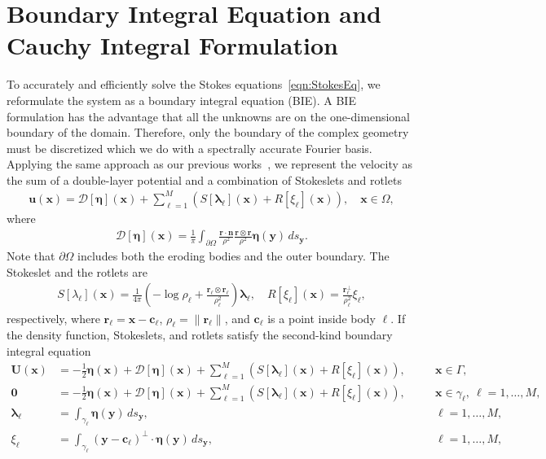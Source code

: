 \documentclass[3p]{elsarticle}
\newcommand{\bd}{{\partial}}
\newcommand{\cc}{{\mathbf{c}}}
\newcommand{\DDD}{{\boldsymbol{\mathcal D}}}
\newcommand{\eeta}{{\boldsymbol\eta}}
\newcommand{\llambda}{{\boldsymbol\lambda}}
\newcommand{\nn}{{\mathbf{n}}}
\newcommand{\rr}{{\mathbf{r}}}
\newcommand{\uu}{{\mathbf{u}}}
\newcommand{\UU}{{\mathbf{U}}}
\newcommand{\xx}{{\mathbf{x}}}
\newcommand{\yy}{{\mathbf{y}}}
\begin{document}
\section{Boundary Integral Equation and Cauchy Integral Formulation}
\label{sec:DLP}
To accurately and efficiently solve the Stokes
  equations~\eqref{eqn:StokesEq}, we reformulate the system as a
  boundary integral equation (BIE). A BIE formulation has the advantage
  that all the unknowns are on the one-dimensional boundary of the
  domain. Therefore, only the boundary of the complex geometry must be
  discretized which we do with a spectrally accurate Fourier basis.
  Applying the same approach as our previous
  works~\citep{quaife2018boundary, chiu2020viscous}, we represent the
  velocity as the sum of a double-layer potential and a combination of
  Stokeslets and rotlets~\cite{pow-mir1987}
\begin{align}
  \uu(\xx) = \DDD[\eeta](\xx) + \sum_{\ell=1}^{M}\left(
    S[\llambda_\ell](\xx) + R[\xi_\ell](\xx)\right), 
    \quad \xx \in \Omega,
  \label{eqn:velocity}
\end{align}
where 
\begin{align}
  \DDD[\eeta](\xx) = \frac{1}{\pi}\int_{\bd\Omega} 
  \frac{\rr \cdot \nn}{\rho^2} \frac{\rr \otimes \rr}{\rho^2}
  \eeta(\yy) \, ds_\yy.
  \label{eqn:velocityDLP}
\end{align}
Note that $\bd\Omega$ includes both the eroding bodies and the outer
boundary. The Stokeslet and the rotlets are
\begin{align}
  S[\lambda_\ell](\xx) = \frac{1}{4\pi} \left(-\log \rho_\ell +
  \frac{\rr_\ell \otimes \rr_\ell}{\rho_\ell^2} \right) \llambda_\ell,
  \quad
  R[\xi_\ell](\xx) = \frac{\rr_\ell^\perp}{\rho_\ell^2}\xi_\ell,
\end{align}
respectively, where $\rr_\ell = \xx - \cc_\ell$, $\rho_\ell =
\|\rr_\ell\|$, and $\cc_\ell$ is a point inside body $\ell$. If the
density function, Stokeslets, and rotlets satisfy the second-kind
boundary integral equation
\begin{subequations}
  \label{eqn:FredBIE}
  \begin{alignat}{3}
    \UU(\xx) &= -\frac{1}{2}\eeta(\xx) + \DDD[\eeta](\xx) + 
      \sum_{\ell=1}^{M}\left(S[\llambda_\ell](\xx) + R[\xi_\ell](\xx)\right), 
      \quad &&\xx \in \Gamma, \\
    \mathbf{0} &= -\frac{1}{2}\eeta(\xx) + \DDD[\eeta](\xx) + 
      \sum_{\ell=1}^{M}\left(S[\llambda_\ell](\xx) + R[\xi_\ell](\xx)\right), 
      &&\xx \in \gamma_\ell, \: \ell = 1,\ldots,M, \\
    \llambda_\ell &= \int_{\gamma_\ell} \eeta(\yy) \, ds_\yy, 
      &&\ell = 1,\ldots,M, \\
    \xi_\ell &= \int_{\gamma_\ell} (\yy - \cc_\ell)^\perp \cdot 
      \eeta(\yy) \, ds_\yy, &&\ell = 1,\ldots,M,
  \end{alignat}
\end{subequations}
\end{document}
